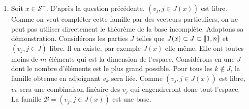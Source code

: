 \begin{enumerate}
  \item Soit $x \in \mathcal{S}^+$. D'après la question précédente, $\left(v_j, j\in J(x)\right)$ est libre. Comme on veut compléter cette famille par des vecteurs particuliers, on ne peut pas utiliser directement le théorème de la base incomplète. Adaptons sa démonstration.\newline
Considérons les parties $J$ telles que $J(x) \subset J \subset \llbracket 1,n\rrbracket$ et $\left(v_j, j\in J\right)$ libre. Il en existe, par exemple $J(x)$ elle même. Elle ont toutes moins de $m$ éléments qui est la dimension de l'espace. Considérons en une $J$ dont le nombre d'éléments est le plus grand possible.\newline
Pour tous les $k \notin J$, la famille obtenue en adjoignant $v_k$ sera liée. Comme $\left(v_j, j\in J(x)\right)$ est libre, $v_k$ sera une combinaison linéaire des $v_j$ qui engendreront donc tout l'espace. La famille $\mathcal{B} = \left(v_j, j\in J(x)\right)$ est une base.
\end{enumerate}

